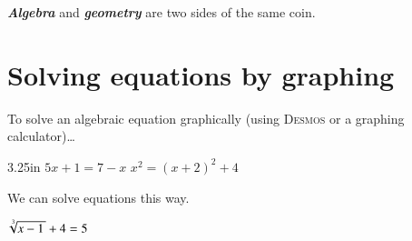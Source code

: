 \begin{myCenteredBox}[width=4in]
    \centering
    {\bfseries\itshape Algebra} and {\bfseries\itshape geometry} are two sides of the same coin.
\end{myCenteredBox}


\section{Solving equations by graphing}

\begin{myConceptSteps}{ To solve an algebraic equation graphically (using {\normalfont\scshape Desmos} or a graphing calculator)\dots}
\end{myConceptSteps}



\begin{my2Problems}[\large]{3.25in}
    {
        $ 5x + 1 = 7-x $
    }
    {
        $ x^2 = (x+2)^2 + 4 $
    }
\end{my2Problems}
%
%
\vspace{1.5\baselineskip}
%
%
We can solve  equations this way.
%
%
\vspace{1.5\baselineskip}
%
%
\begin{myProblem}[\large]{3.25in}
    {
        $ \myRoot[3]{x-1} + 4 = 5 $
    }
\end{myProblem}
